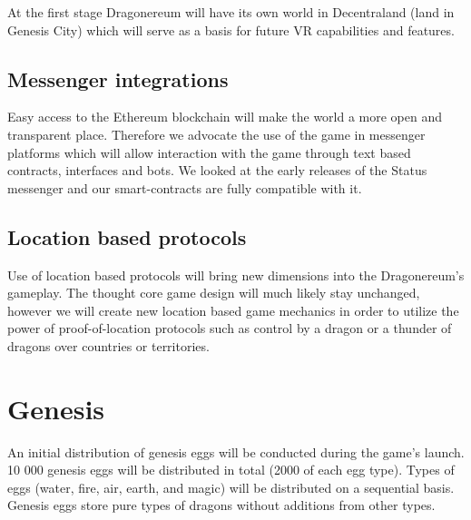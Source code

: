 \documentclass[12pt]{article}
\begin{document}
At the first stage Dragonereum will have its own world in Decentraland (land in Genesis City) which will serve as a basis for future VR capabilities and features.\par


\vspace{\baselineskip}
 \subsection{Messenger integrations}\label{Messenger integrations} \par

Easy access to the Ethereum blockchain will make the world a more open and transparent place. Therefore we advocate the use of the game in messenger platforms which will allow interaction with the game through text based contracts, interfaces and bots. We looked at the early releases of the Status messenger and our smart-contracts are fully compatible with it.\par


\vspace{\baselineskip}
 \subsection{Location based protocols}\label{Location based protocols} \par

Use of location based protocols will bring new dimensions into the Dragonereum’s gameplay. The thought core game design will much likely stay unchanged, however we will create new location based game mechanics in order to utilize the power of proof-of-location protocols such as control by a dragon or a thunder of dragons over countries or territories.\\



\newpage
\par

\section{Genesis}
 \label{Genesis}  \par

An initial distribution of genesis eggs will be conducted during the game’s launch. 10 000 genesis eggs will be distributed in total (2000 of each egg type). Types of eggs (water, fire, air, earth, and magic) will be distributed on a sequential basis. Genesis eggs store pure types of dragons without additions from other types.\par
\end{document}
